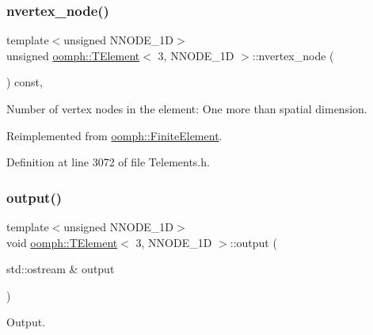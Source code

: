 \subsubsection{\texorpdfstring{nvertex\+\_\+node()}{nvertex\_node()}}
{\footnotesize\ttfamily template$<$unsigned N\+N\+O\+D\+E\+\_\+1D$>$ \\
unsigned \hyperlink{classoomph_1_1TElement}{oomph\+::\+T\+Element}$<$ 3, N\+N\+O\+D\+E\+\_\+1D $>$\+::nvertex\+\_\+node (\begin{DoxyParamCaption}{ }\end{DoxyParamCaption}) const\hspace{0.3cm}{\ttfamily [inline]}, {\ttfamily [virtual]}}



Number of vertex nodes in the element\+: One more than spatial dimension. 



Reimplemented from \hyperlink{classoomph_1_1FiniteElement_a45631a7aa50efc3123a921d114f84cba}{oomph\+::\+Finite\+Element}.



Definition at line 3072 of file Telements.\+h.

\mbox{\label{classoomph_1_1TElement_3_013_00_01NNODE__1D_01_4_a16ce587e9046f02d9861b6d9d2847a84}} 
\subsubsection{\texorpdfstring{output()}{output()}\hspace{0.1cm}{\footnotesize\ttfamily [1/4]}}
{\footnotesize\ttfamily template$<$unsigned N\+N\+O\+D\+E\+\_\+1D$>$ \\
void \hyperlink{classoomph_1_1TElement}{oomph\+::\+T\+Element}$<$ 3, N\+N\+O\+D\+E\+\_\+1D $>$\+::output (\begin{DoxyParamCaption}\item[{std\+::ostream \&}]{output }\end{DoxyParamCaption})\hspace{0.3cm}{\ttfamily [virtual]}}



Output. 

